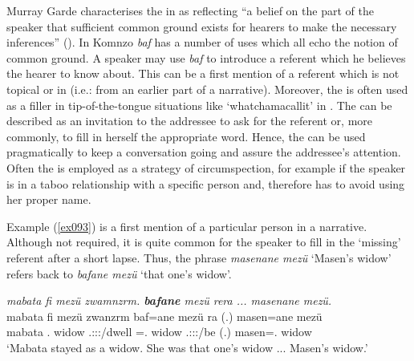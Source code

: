 Murray Garde characterises the   in  as reflecting ``a belief on the part of the speaker that sufficient common ground exists for hearers to make the necessary inferences'' (\citeyear[250]{Garde:2013ut}). In Komnzo \textit{baf} has a number of uses which all echo the notion of common ground. A speaker may use \emph{baf} to introduce a referent which he believes the hearer to know about. This can be a first mention of a referent which is not topical or in  (i.e.: from an earlier part of a narrative). Moreover, the  is often used as a filler in tip-of-the-tongue situations like `whatchamacallit' in . The  can be described as an invitation to the addressee to ask for the referent or, more commonly, to fill in herself the appropriate word. Hence, the  can be used pragmatically to keep a conversation going and assure the addressee's attention. Often the  is employed as a strategy of circumspection, for example if the speaker is in a taboo relationship with a specific person and, therefore has to avoid using her proper name.%

Example (\ref{ex093}) is a first mention of a particular person in a narrative. Although not required, it is quite common for the speaker to fill in the `missing' referent after a short lapse. Thus, the phrase \emph{masenane mezü} `Masen's widow' refers back to \emph{bafane mezü} `that one's widow'.

\begin{exe}
	\ex \emph{mabata fi mezü zwamnzrm. \textbf{bafane} mezü rera ... masenane mezü.}\\
	\gll mabata fi mezü zwanzrm baf=ane mezü ra (.) masen=ane mezü\\
	mabata \Third.\Abs{} widow \Tsg{}.\F{}:\Sbj:\Pst:\Dur{}/dwell \Recog{}=\Poss.\Sg{} widow \Tsg{}.\F{}:\Sbj:\Pst:\Ipfv/be (.) masen=\Poss.\Sg{} widow\\
	\trans `Mabata stayed as a widow. She was that one's widow ... Masen's widow.'
	\label{ex093}
\end{exe}

